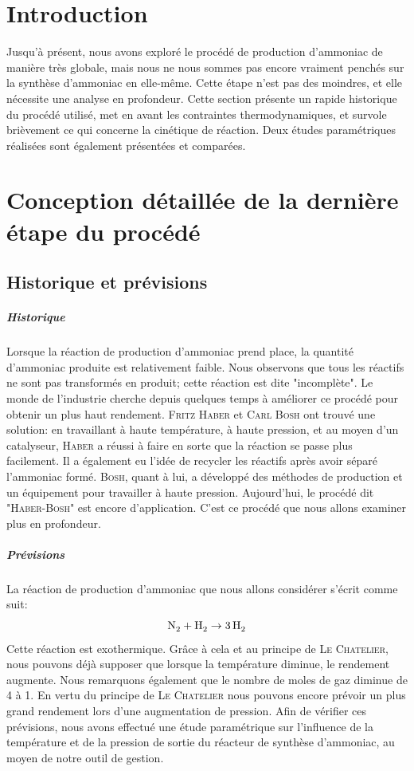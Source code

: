 \chapter{Introduction}
Jusqu'à présent, nous avons exploré le procédé de production d'ammoniac de manière très globale, mais nous ne nous
sommes pas encore vraiment penchés sur la synthèse d'ammoniac en elle-même. Cette étape n'est pas des moindres, et
elle nécessite une analyse en profondeur. Cette section présente un rapide historique du procédé utilisé, met en
avant les contraintes thermodynamiques, et survole brièvement ce qui concerne la cinétique de réaction. Deux études
paramétriques réalisées sont également présentées et comparées.

\chapter{Conception détaillée de la dernière étape du procédé}
\section{Historique et prévisions}

\paragraph{Historique}
Lorsque la réaction de production d'ammoniac prend place, la quantité d'ammoniac produite est relativement faible.
Nous observons que tous les réactifs ne sont pas transformés en produit; cette réaction est dite "incomplète".
Le monde de l'industrie cherche depuis quelques temps à améliorer ce procédé pour obtenir un plus haut rendement.
\textsc{Fritz Haber} et \textsc{Carl Bosh} ont trouvé une solution: en travaillant à haute température, à haute pression, et au moyen
d'un catalyseur, \textsc{Haber} a réussi à faire en sorte que la réaction se passe plus facilement. Il a également eu l'idée
de recycler les réactifs après avoir séparé l'ammoniac formé. \textsc{Bosh}, quant à lui, a développé des méthodes de
production et un équipement pour travailler à haute pression. Aujourd'hui, le procédé dit "\textsc{Haber-Bosh}" est encore
d'application. C'est ce procédé que nous allons examiner plus en profondeur.

\paragraph{Prévisions}
La réaction de production d'ammoniac que nous allons considérer s'écrit comme suit:
$$\ce{N2} + \ce{H2} \rightarrow \ce{3H2}$$
Cette réaction est exothermique. Grâce à cela et au principe de \textsc{Le Chatelier}, nous pouvons déjà supposer que lorsque
la température diminue, le rendement augmente. Nous remarquons également que le nombre de moles de gaz diminue de 4 à
1. En vertu du principe de \textsc{Le Chatelier} nous pouvons encore prévoir un plus grand rendement lors d'une augmentation de
pression. Afin de vérifier ces prévisions, nous avons effectué une étude paramétrique sur l'influence de la température et de la
pression de sortie du réacteur de synthèse d'ammoniac, au moyen de notre outil de gestion.

